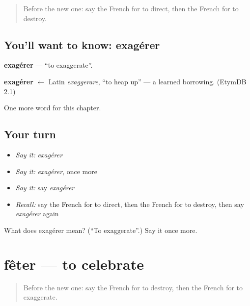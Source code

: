 \label{lesson:FR-C182-exagerer}



\begin{quote}
Before the new one: say the French for to direct, then the French for to destroy.
\end{quote}

\subsection*{You'll want to know: exagérer}
\textbf{exagérer} — \textquotedblleft{}to exaggerate\textquotedblright{}.

\begin{cousinweb}
\textbf{exagérer} $\leftarrow$ Latin \emph{exaggerare}, \textquotedblleft{}to heap up\textquotedblright{} — a learned borrowing. (EtymDB 2.1)
\end{cousinweb}

\begin{grammarlens}[title={What you've built}]
One more word for this chapter.
\end{grammarlens}

\subsection*{Your turn}
\begin{itemize}
\raggedright
  \item \emph{Say it:} \emph{exagérer}
  \item \emph{Say it:} \emph{exagérer}, once more
  \item \emph{Say it:} say \emph{exagérer}
  \item \emph{Recall:} say the French for to direct, then the French for to destroy, then say \emph{exagérer} again
\end{itemize}

\begin{tcolorbox}[breakable,colback=teal!4,colframe=teal!35!black,title={Before you move on}]
What does exagérer mean? (\textquotedblleft{}To exaggerate\textquotedblright{}.) Say it once more.
\end{tcolorbox}
\section[fêter]{fêter — to celebrate}

\label{lesson:FR-C182-feter}



\begin{quote}
Before the new one: say the French for to destroy, then the French for to exaggerate.
\end{quote}

